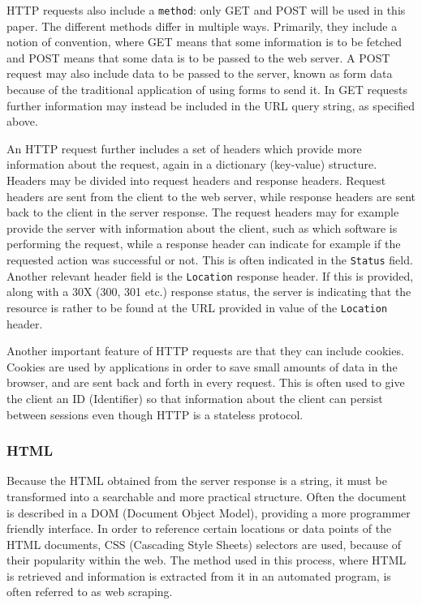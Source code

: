 \documentclass{article}
\begin{document}
	HTTP requests also include a \texttt{method}: only GET and POST will be used in this paper. The different methods differ in multiple ways. Primarily, they include a notion of convention, where GET means that some information is to be fetched and POST means that some data is to be passed to the web server. A POST request may also include data to be passed to the server, known as form data because of the traditional application of using forms to send it. In GET requests further information may instead be included in the URL query string, as specified above.
	
	An HTTP request further includes a set of headers which provide more information about the request, again in a dictionary (key-value) structure. Headers may be divided into request headers and response headers. Request headers are sent from the client to the web server, while response headers are sent back to the client in the server response. The request headers may for example provide the server with information about the client, such as which software is performing the request, while a response header can indicate for example if the requested action was successful or not. This is often indicated in the \texttt{Status} field. Another relevant header field is the \texttt{Location} response header. If this is provided, along with a 30X (300, 301 etc.) response status, the server is indicating that the resource is rather to be found at the URL provided in value of the \texttt{Location} header.\cite{wikipedia http request}\cite{wikipedia url}
	
	Another important feature of HTTP requests are that they can include cookies. Cookies are used by applications in order to save small amounts of data in the browser, and are sent back and forth in every request. This is often used to give the client an ID (Identifier) so that information about the client can persist between sessions even though HTTP is a stateless protocol.\cite{wikipedia cookie}
	
	\subsubsection{HTML}
	Because the HTML obtained from the server response is a string, it must be transformed into a searchable and more practical structure. Often the document is described in a DOM (Document Object Model), providing a more programmer friendly interface. In order to reference certain locations or data points of the HTML documents, CSS (Cascading Style Sheets) selectors are used, because of their popularity within the web. The method used in this process, where HTML is retrieved and information is extracted from it in an automated program, is often referred to as web scraping.\cite{wikipedia css}\cite{wikipedia web scraping}
	
\end{document}
